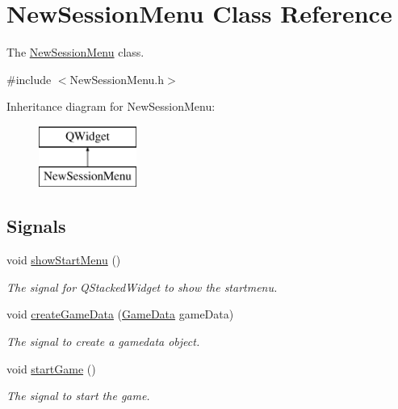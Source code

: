 \hypertarget{classNewSessionMenu}{\section{New\-Session\-Menu Class Reference}
\label{classNewSessionMenu}
}


The \hyperlink{classNewSessionMenu}{New\-Session\-Menu} class.  




{\ttfamily \#include $<$New\-Session\-Menu.\-h$>$}

Inheritance diagram for New\-Session\-Menu\-:\begin{figure}[H]
\begin{center}
\leavevmode
\includegraphics[height=2.000000cm]{classNewSessionMenu}
\end{center}
\end{figure}
\subsection*{Signals}
\begin{DoxyCompactItemize}
\item 
\hypertarget{classNewSessionMenu_aec46b3d790d583bd0c0fb35a7cc89d58}{void \hyperlink{classNewSessionMenu_aec46b3d790d583bd0c0fb35a7cc89d58}{show\-Start\-Menu} ()}\label{classNewSessionMenu_aec46b3d790d583bd0c0fb35a7cc89d58}

\begin{DoxyCompactList}\small\item\em The signal for Q\-Stacked\-Widget to show the startmenu. \end{DoxyCompactList}\item 
void \hyperlink{classNewSessionMenu_add9c9c91b8f92fde390187463b1f40ba}{create\-Game\-Data} (\hyperlink{classGameData}{Game\-Data} game\-Data)
\begin{DoxyCompactList}\small\item\em The signal to create a gamedata object. \end{DoxyCompactList}\item 
\hypertarget{classNewSessionMenu_afa1a5423cfcb5af562e30d1f66040ce5}{void \hyperlink{classNewSessionMenu_afa1a5423cfcb5af562e30d1f66040ce5}{start\-Game} ()}\label{classNewSessionMenu_afa1a5423cfcb5af562e30d1f66040ce5}

\begin{DoxyCompactList}\small\item\em The signal to start the game. \end{DoxyCompactList}\end{DoxyCompactItemize}
